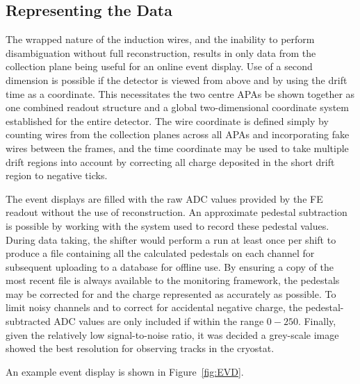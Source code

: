 \subsection{Representing the Data}\label{RepresentingEVDData}

The wrapped nature of the induction wires, and the inability to perform disambiguation without full reconstruction, results in only data from the collection plane being useful for an online event display.  Use of a second dimension is possible if the detector is viewed from above and by using the drift time as a coordinate.  This necessitates the two centre APAs be shown together as one combined readout structure and a global two-dimensional coordinate system established for the entire detector.  The wire coordinate is defined simply by counting wires from the collection planes across all APAs and incorporating fake wires between the frames, and the time coordinate may be used to take multiple drift regions into account by correcting all charge deposited in the short drift region to negative ticks.

The event displays are filled with the raw ADC values provided by the FE readout without the use of reconstruction.  An approximate pedestal subtraction is possible by working with the system used to record these pedestal values.  During data taking, the shifter would perform a run at least once per shift to produce a file containing all the calculated pedestals on each channel for subsequent uploading to a database for offline use.  By ensuring a copy of the most recent file is always available to the monitoring framework, the pedestals may be corrected for and the charge represented as accurately as possible.  To limit noisy channels and to correct for accidental negative charge, the pedestal-subtracted ADC values are only included if within the range $0-250$.  Finally, given the relatively low signal-to-noise ratio, it was decided a grey-scale image showed the best resolution for observing tracks in the cryostat.

An example event display is shown in Figure~\ref{fig:EVD}.

